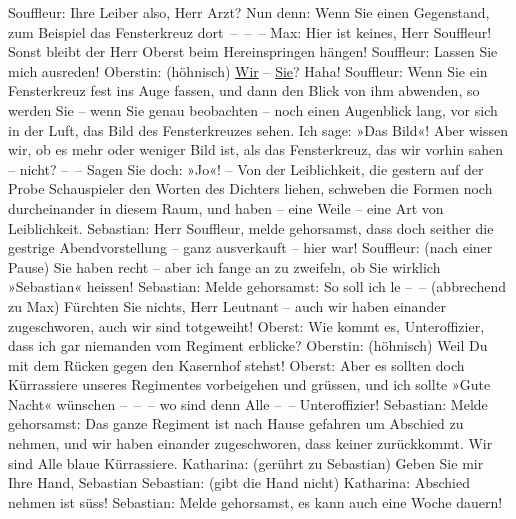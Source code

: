 \documentclass[twoside=false,titlepage=false,open=any, parskip=never, fontsize=12pt, headings=small, chapterprefix=false, appendixprefix=false]{scrbook}
\newcommand{\pbposition}{\depth}
\newcommand{\pb}{\nobreak\hspace{0pt}\raisebox{-0.1em}{\raisebox{\pbposition}{\textnormal{|}}}\nobreak\hspace{0pt}}
\begin{document}
           \pstart
           Souffleur: Ihre Leiber also, Herr Arzt? Nun denn: Wenn Sie einen Gegenstand, zum
					Beispiel das Fensterkreuz dort – – –\pend
           \pstart
           Max: Hier ist keines, Herr Souffleur! Sonst bleibt der Herr Oberst beim
					Hereinspringen hängen!\pend
           \pstart
           {\pb}Souffleur: Lassen Sie mich
					ausreden!\pend
           \pstart
           Oberstin: (höhnisch) \uline{Wir} – \uline{Sie}? Haha!\pend
           \pstart
           Souffleur: Wenn Sie ein Fensterkreuz fest ins Auge fassen, und dann den Blick von
					ihm abwenden, so werden Sie – wenn Sie genau beobachten – noch einen Augenblick
					lang, vor sich in der Luft, das Bild des Fensterkreuzes sehen. Ich sage: »Das
					Bild«! Aber wissen wir, ob es mehr oder weniger Bild ist, als das Fensterkreuz,
					das wir vorhin sahen – nicht? – – Sagen Sie doch: »Jo«! – Von der
					Leiblichkeit, die gestern auf der Probe Schauspieler den Worten des Dichters
					liehen, schweben die Formen noch durcheinander in diesem Raum, und haben – eine
					Weile – eine Art von Leiblichkeit.\pend
           \pstart
           Sebastian: Herr Souffleur, melde gehorsamst, dass doch seither die gestrige
					Abendvorstellung – ganz ausverkauft – hier war!\pend
           \pstart
           Souffleur: (nach einer Pause) Sie haben recht – aber ich fange an zu zweifeln, ob
					Sie wirklich »Sebastian« heissen!\pend
           \pstart
           Sebastian: Melde gehorsamst: So soll ich le – – (abbrechend zu Max) Fürchten
					Sie nichts, Herr Leutnant – auch wir haben einander zugeschworen, auch wir sind
					totgeweiht!\pend
           \pstart
           Oberst: Wie kommt es, Unteroffizier, dass ich gar niemanden vom Regiment
					erblicke?\pend
           \pstart
           Oberstin: (höhnisch) Weil Du mit dem Rücken gegen den Kasernhof stehst!\pend
           \pstart
           Oberst: Aber es sollten doch Kürrassiere unseres Regimentes vorbeigehen und
					grüssen, und ich sollte »Gute Nacht« wünschen – – – wo sind denn Alle
					– – Unteroffizier!\pend
           \pstart
           Sebastian: Melde gehorsamst: Das ganze Regiment ist nach Hause gefahren um
					Abschied zu nehmen, und wir haben einander {\pb}zugeschworen, dass keiner
					zurückkommt. Wir sind Alle blaue Kürrassiere.\pend
           \pstart
           Katharina: (gerührt zu Sebastian) Geben Sie mir Ihre Hand, Sebastian\pend
           \pstart
           Sebastian: (gibt die Hand nicht)\pend
           \pstart
           Katharina: Abschied nehmen ist süss!\pend
           \pstart
           Sebastian: Melde gehorsamst, es kann auch eine Woche dauern!\pend
\end{document}
